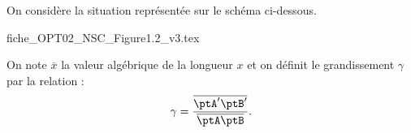 \hauteurLargeurCadreReponse		{7mm}{4cm}
\typeEntrainement				{} %
\initialisationEntrainement

%

On considère la situation représentée sur le schéma ci-dessous. 

\begin{center}
{fiche_OPT02_NSC_Figure1.2_v3.tex}
\end{center}

On note $\overline{x}$ la valeur algébrique de la longueur $x$ et on définit le grandissement $\gamma$ par la relation :
\[
\gamma = \frac{\overline{\ptA'\ptB'}}{\overline{\ptA\ptB}}.
\]



\debutEntrainement

